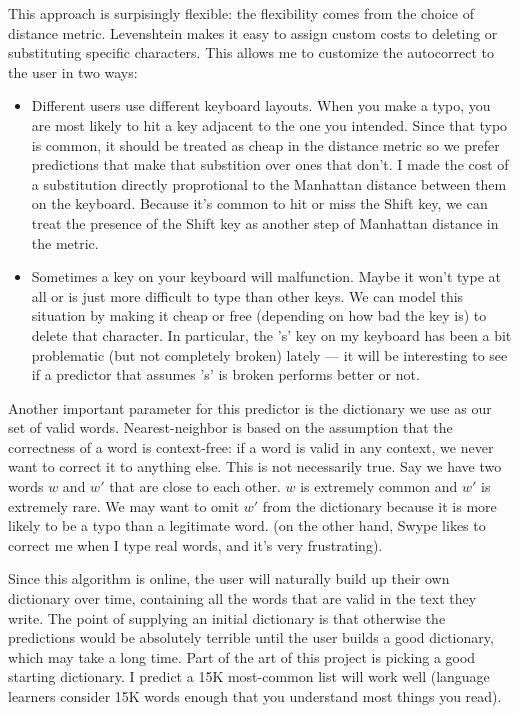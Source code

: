 \documentclass[12pt]{article}
\begin{document}
This approach is surpisingly flexible: the flexibility comes from the
choice of distance metric. Levenshtein makes it easy to assign custom
costs to deleting or substituting specific characters. This allows me
to customize the autocorrect to the user in two ways:
\begin{itemize}
\item Different users use different keyboard layouts. When you make a
  typo, you are most likely to hit a key adjacent to the one you
  intended. Since that typo is common, it should be treated as cheap
  in the distance metric so we prefer predictions that make that
  substition over ones that don't.  I made the cost of a substitution
  directly proprotional to the Manhattan distance between them on the
  keyboard. Because it's common to hit or miss the Shift key, we can
  treat the presence of the Shift key as another step of Manhattan
  distance in the metric.
\item Sometimes a key on your keyboard will malfunction. Maybe it
  won't type at all or is just more difficult to type than other
  keys. We can model this situation by making it cheap or free
  (depending on how bad the key is) to delete that character.  In
  particular, the 's' key on my keyboard has been a bit problematic
  (but not completely broken) lately --- it will be interesting to see
  if a predictor that assumes 's' is broken performs better or not.
\end{itemize}

Another important parameter for this predictor is the dictionary we
use as our set of valid words.  Nearest-neighbor is based on the
assumption that the correctness of a word is context-free: if a word
is valid in any context, we never want to correct it to anything
else. This is not necessarily true. Say we have two words $w$ and $w'$
that are close to each other. $w$ is extremely common and $w'$ is
extremely rare. We may want to omit $w'$ from the dictionary because
it is more likely to be a typo than a legitimate word. (on the other
hand, Swype likes to correct me when I type real words, and it's very
frustrating).

Since this algorithm is online, the user will naturally build up their
own dictionary over time, containing all the words that are valid in
the text they write. The point of supplying an initial dictionary is
that otherwise the predictions would be absolutely terrible until the
user builds a good dictionary, which may take a long time.  Part of
the art of this project is picking a good starting dictionary. I
predict a 15K most-common list will work well (language learners
consider 15K words enough that you understand most things you read).
\end{document}

